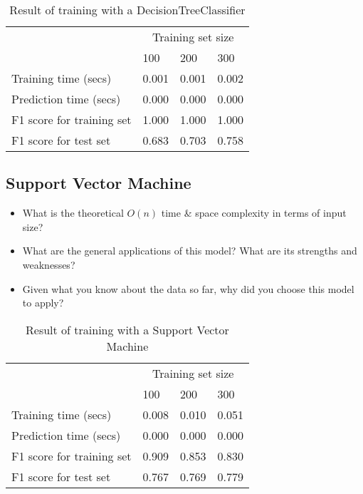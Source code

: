 \documentclass[12pt]{article}
\begin{document}
\setlength{\extrarowheight}{1.5pt}
\begin{table}[!htbp]
\caption{Result of training with a DecisionTreeClassifier} %
\centering %
\begin{tabular}{|p{6cm}|p{1.5cm}|p{1.5cm}|p{1.5cm}|} %
\hline %
& \multicolumn{3}{c|}{Training set size}\\[5pt]
\cline{2-4} 
& 100 & 200 & 300\\[0.5ex]
\hline %

Training time (secs)   &       0.001 & 0.001 & 0.002 \\
Prediction time (secs)   &     0.000 & 0.000 & 0.000 \\
F1 score for training set  &   1.000 & 1.000 & 1.000 \\
F1 score for test set    &     0.683 & 0.703 & 0.758 \\
\hline %
\end{tabular}
\label{decisionTreeTable}
\end{table}


\subsection*{Support Vector Machine}
\begin{itemize} [noitemsep,nolistsep]
\item What is the theoretical $O(n)$ time \& space complexity in terms of input size?
\item What are the general applications of this model? What are its strengths and weaknesses?
\item Given what you know about the data so far, why did you choose this model to apply?
\end{itemize} 


\setlength{\extrarowheight}{1.5pt}
\begin{table}[!htbp]
\caption{Result of training with a Support Vector Machine} %
\centering %
\begin{tabular}{|p{6cm}|p{1.5cm}|p{1.5cm}|p{1.5cm}|} %
\hline %
& \multicolumn{3}{c|}{Training set size}\\[5pt]
\cline{2-4} 
& 100 & 200 & 300\\[0.5ex]
\hline %

Training time (secs)   &       0.008 & 0.010 & 0.051 \\
Prediction time (secs)   &     0.000 & 0.000 & 0.000 \\
F1 score for training set  &   0.909 & 0.853 & 0.830 \\
F1 score for test set    &     0.767 & 0.769 & 0.779 \\
\hline %
\end{tabular}
\label{svmTable}
\end{table}
\end{document}
